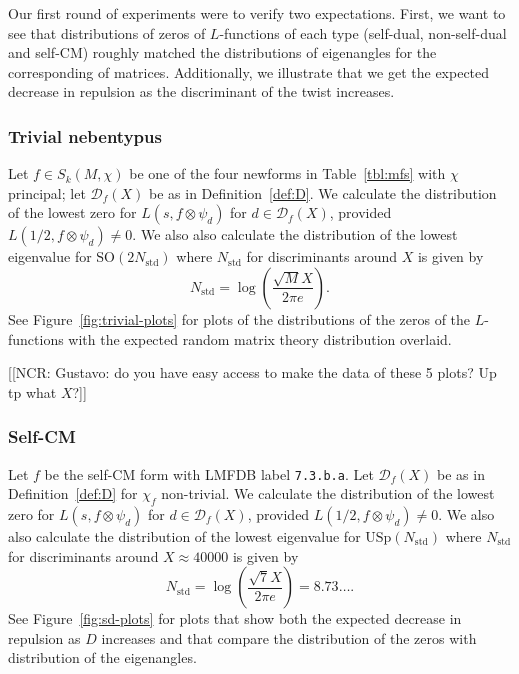 \documentclass[11pt]{amsart}
\newcommand{\ncr}[1]{{\color{blue}\textsf{[[NCR: #1]]}}}
\begin{document}
Our first round of experiments were to verify two expectations.  First, we want to see that distributions of zeros of $L$-functions of each type (self-dual, non-self-dual and self-CM) roughly matched the distributions of eigenangles for the corresponding of matrices.  Additionally, we illustrate that we get the expected decrease in repulsion as the discriminant of the twist increases.

\subsubsection{Trivial nebentypus}

Let $f\in S_k(M,\chi)$ be one of the four newforms in Table~\ref{tbl:mfs} with $\chi$ principal; let $\mathscr{D}_f (X )$ be as in Definition~\ref{def:D}. We calculate the distribution of the lowest zero for $L(s, f \otimes \psi_d )$ for $d \in \mathscr{D}_f (X )$, provided $L(1/2, f \otimes \psi_d ) \neq 0$. We also also calculate the distribution of the lowest eigenvalue for $\textrm{SO}(2N_{\text{std}} )$ where $N_\text{std}$ for discriminants around $X$ is given by 
\[
N_\text{std} = \log\left (\frac{\sqrt{M}X}{2\pi e}\right ).
\]
See Figure~\ref{fig:trivial-plots} for plots of the distributions of the zeros of the $L$-functions with the expected random matrix theory distribution overlaid. 

\ncr{Gustavo:  do you have easy access to make the data of these 5 plots?  Up tp what $X$?}

\subsubsection{Self-CM} 

Let $f$ be the self-CM form with LMFDB label \texttt{7.3.b.a}. Let $\mathscr{D}_f (X )$ be as in Definition~\ref{def:D} for $\chi_f$ non-trivial. We calculate the distribution of the lowest zero for $L(s, f \otimes \psi_d )$ for $d \in \mathscr{D}_f (X )$, provided $L(1/2, f \otimes \psi_d ) \neq 0$. We also also calculate the distribution of the lowest eigenvalue for $\textrm{USp}(N_{\text{std}} )$ where $N_\text{std}$ for discriminants around $X\approx 40000$ is given by 
\[
N_\text{std} = \log\left (\frac{\sqrt{7}X}{2\pi e}\right ) = 8.73\dots.
\]
See Figure~\ref{fig:sd-plots} for plots that show both the expected decrease in repulsion as $D$ increases and that compare the distribution of the zeros with distribution of the eigenangles.
\end{document}
